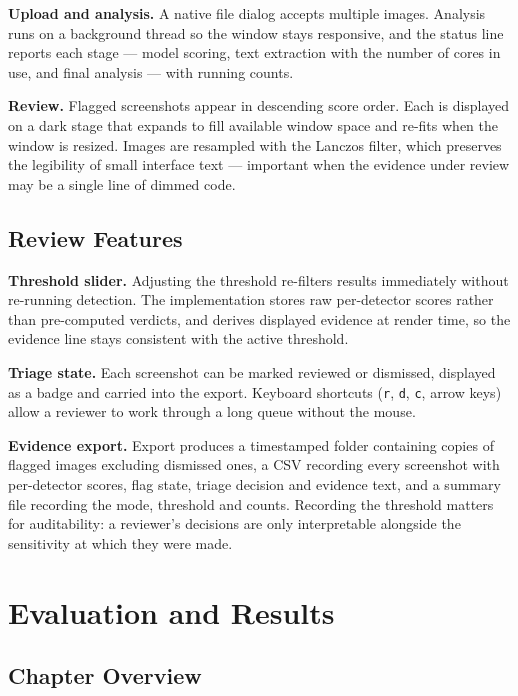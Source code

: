 \documentclass[12pt,oneside]{report}
\newcommand{\code}[1]{\texttt{\small #1}}
\begin{document}
\textbf{Upload and analysis.} A native file dialog accepts multiple images.
Analysis runs on a background thread so the window stays responsive, and the
status line reports each stage --- model scoring, text extraction with the
number of cores in use, and final analysis --- with running counts.

\textbf{Review.} Flagged screenshots appear in descending score order. Each is
displayed on a dark stage that expands to fill available window space and
re-fits when the window is resized. Images are resampled with the Lanczos
filter, which preserves the legibility of small interface text --- important
when the evidence under review may be a single line of dimmed code.

\section{Review Features}
\label{sec:uifeatures}

\textbf{Threshold slider.} Adjusting the threshold re-filters results
immediately without re-running detection. The implementation stores raw
per-detector scores rather than pre-computed verdicts, and derives displayed
evidence at render time, so the evidence line stays consistent with the active
threshold.

\textbf{Triage state.} Each screenshot can be marked reviewed or dismissed,
displayed as a badge and carried into the export. Keyboard shortcuts
(\code{r}, \code{d}, \code{c}, arrow keys) allow a reviewer to work through a
long queue without the mouse.

\textbf{Evidence export.} Export produces a timestamped folder containing
copies of flagged images excluding dismissed ones, a CSV recording every
screenshot with per-detector scores, flag state, triage decision and evidence
text, and a summary file recording the mode, threshold and counts. Recording
the threshold matters for auditability: a reviewer's decisions are only
interpretable alongside the sensitivity at which they were made.

\chapter{Evaluation and Results}
\label{ch:evaluation}

\section{Chapter Overview}
\end{document}

